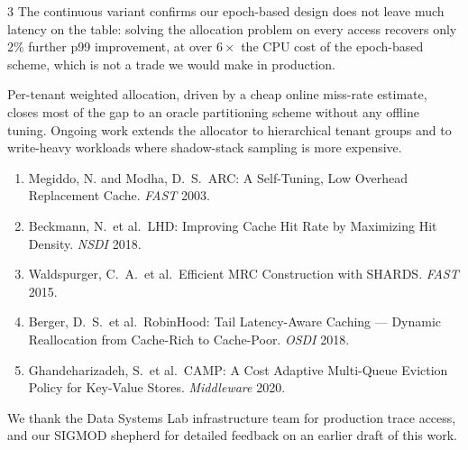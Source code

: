 \documentclass[a0,portrait,final]{sciposter}
\begin{document}
\begin{multicols}{3}
The continuous variant confirms our epoch-based design does not leave much
latency on the table: solving the allocation problem on every access
recovers only 2\% further p99 improvement, at over $6\times$ the CPU cost
of the epoch-based scheme, which is not a trade we would make in
production.

Per-tenant weighted allocation, driven by a cheap online miss-rate
estimate, closes most of the gap to an oracle partitioning scheme without
any offline tuning. Ongoing work extends the allocator to hierarchical
tenant groups and to write-heavy workloads where shadow-stack sampling is
more expensive.

\begin{footnotesize}
\begin{enumerate}
\item Megiddo, N. and Modha, D.\ S.\ ARC: A Self-Tuning, Low Overhead Replacement Cache. \textit{FAST} 2003.
\item Beckmann, N.\ et al.\ LHD: Improving Cache Hit Rate by Maximizing Hit Density. \textit{NSDI} 2018.
\item Waldspurger, C.\ A.\ et al.\ Efficient MRC Construction with SHARDS. \textit{FAST} 2015.
\item Berger, D.\ S.\ et al.\ RobinHood: Tail Latency-Aware Caching --- Dynamic Reallocation from Cache-Rich to Cache-Poor. \textit{OSDI} 2018.
\item Ghandeharizadeh, S.\ et al.\ CAMP: A Cost Adaptive Multi-Queue Eviction Policy for Key-Value Stores. \textit{Middleware} 2020.
\end{enumerate}
\end{footnotesize}

\begin{footnotesize}
We thank the Data Systems Lab infrastructure team for production trace
access, and our SIGMOD shepherd for detailed feedback on an earlier draft
of this work.
\end{footnotesize}

\end{multicols}
\end{document}
